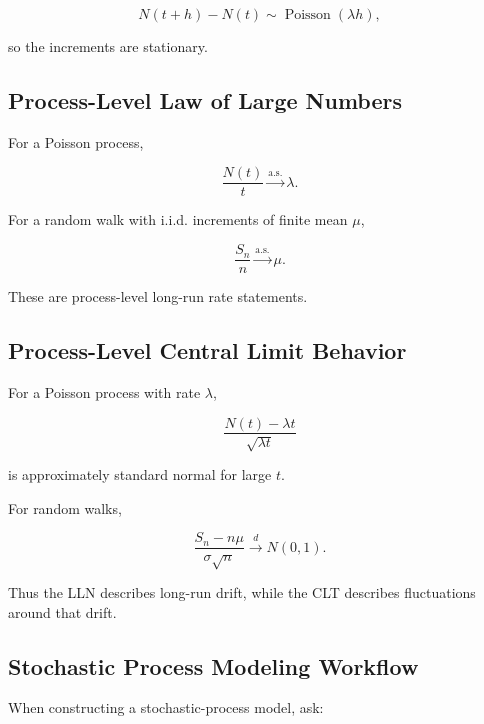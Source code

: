 \[
N(t+h)-N(t)
\sim
\operatorname{Poisson}(\lambda h),
\]

so the increments are stationary.

\subsection{Process-Level Law of Large Numbers}
\label{subsec:process-lln}

For a Poisson process,

\[
\boxed{
\frac{N(t)}{t}
\xrightarrow{\text{a.s.}}
\lambda.
}
\]

For a random walk with i.i.d. increments of finite mean \(\mu\),

\[
\boxed{
\frac{S_n}{n}
\xrightarrow{\text{a.s.}}
\mu.
}
\]

These are process-level long-run rate statements.

\subsection{Process-Level Central Limit Behavior}
\label{subsec:process-clt}

For a Poisson process with rate \(\lambda\),

\[
\frac{
N(t)-\lambda t
}{
\sqrt{\lambda t}
}
\]

is approximately standard normal for large \(t\).

For random walks,

\[
\frac{
S_n-n\mu
}{
\sigma\sqrt{n}
}
\xrightarrow{d}
N(0,1).
\]

Thus the LLN describes long-run drift, while the CLT describes
fluctuations around that drift.

\subsection{Stochastic Process Modeling Workflow}
\label{subsec:stochastic-process-modeling-workflow}

When constructing a stochastic-process model, ask:

